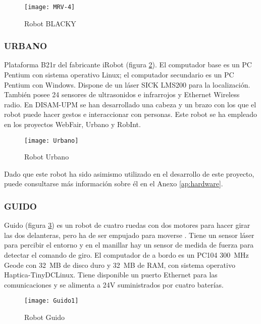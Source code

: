 \begin{figure}[hbt]
  \centering\texttt{[image: MRV-4]}\\
  \caption{Robot BLACKY}\label{fg:mrv4}
\end{figure}

\subsubsection{URBANO}\label{Urbano}
Plataforma B21r del fabricante iRobot (figura \ref{fg:urbanor}). El computador base es un PC Pentium con sistema operativo Linux; el computador secundario es un PC Pentium con Windows. Dispone de un láser SICK LMS200 para la localización. También posee 24 sensores de ultrasonidos e infrarrojos y Ethernet Wireless radio. En DISAM-UPM se han desarrollado una cabeza y un brazo con los que el robot puede hacer gestos e interaccionar con personas. Este robot se ha empleado en los proyectos WebFair, Urbano y RobInt.

\begin{figure}[hbt]
  \centering\texttt{[image: Urbano]}\\
  \caption{Robot Urbano}\label{fg:urbanor}
\end{figure}

Dado que este robot ha sido asimismo utilizado en el desarrollo de este proyecto, puede consultarse más información sobre él en el Anexo \ref{ap:hardware}.

\subsubsection{GUIDO}
Guido (figura \ref{fg:guidor}) es un robot de cuatro ruedas con dos motores para hacer girar las dos delanteras, pero ha de ser empujado para moverse \cite{Rodriguez-Losada05}. Tiene un sensor láser para percibir el entorno y en el manillar hay un sensor de medida de fuerza para detectar el comando de giro. El computador de a bordo es un PC104 300~MHz Geode con 32~MB de disco duro y 32~MB de RAM, con sistema operativo Haptica-TinyDCLinux. Tiene disponible un puerto Ethernet para las comunicaciones y se alimenta a 24V suministrados por cuatro baterías.

\begin{figure}[h]
  \centering\texttt{[image: Guido1]}\\
  \caption{Robot Guido}\label{fg:guidor}
\end{figure}

